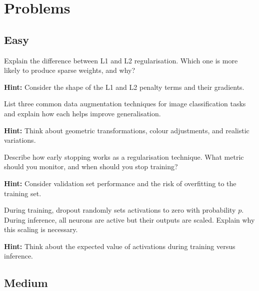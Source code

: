 
\section*{Problems}

\subsection*{Easy}

\begin{problem}[L1 vs L2 Regularisation]
Explain the difference between L1 and L2 regularisation. Which one is more likely to produce sparse weights, and why?

\textbf{Hint:} Consider the shape of the L1 and L2 penalty terms and their gradients.
\end{problem}

\begin{problem}
List three common data augmentation techniques for image classification tasks and explain how each helps improve generalisation.

\textbf{Hint:} Think about geometric transformations, colour adjustments, and realistic variations.
\end{problem}

\begin{problem}
Describe how early stopping works as a regularisation technique. What metric should you monitor, and when should you stop training?

\textbf{Hint:} Consider validation set performance and the risk of overfitting to the training set.
\end{problem}

\begin{problem}
During training, dropout randomly sets activations to zero with probability $p$. During inference, all neurons are active but their outputs are scaled. Explain why this scaling is necessary.

\textbf{Hint:} Think about the expected value of activations during training versus inference.
\end{problem}

\subsection*{Medium}

